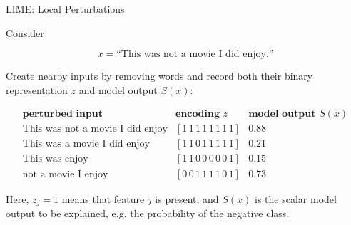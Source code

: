 \documentclass[11pt,compress,t,notes=noshow, xcolor=table]{beamer}
\begin{document}

\begin{vbframe}{LIME: Local Perturbations}

Consider

\[
x=
\text{``This was not a movie I did enjoy.''}
\]

Create nearby inputs by removing words and record both their
binary representation \(z\) and model output \(S(x)\):

\[
\begin{array}{lll}
\textbf{perturbed input} & \textbf{encoding } z & \textbf{model output } S(x)\\
\hline
\text{This was not a movie I did enjoy}
&
[1\,1\,1\,1\,1\,1\,1\,1]
&
0.88
\\[0.3em]

\text{This was a movie I did enjoy}
&
[1\,1\,0\,1\,1\,1\,1\,1]
&
0.21
\\[0.3em]

\text{This was enjoy}
&
[1\,1\,0\,0\,0\,0\,0\,1]
&
0.15
\\[0.3em]

\text{not a movie I enjoy}
&
[0\,0\,1\,1\,1\,1\,0\,1]
&
0.73
\end{array}
\]

Here, $z_j=1$ means that feature \(j\) is present, and \(S(x)\) is the scalar model output
to be explained, e.g. the probability of the negative class.



\end{vbframe}


\end{document}
